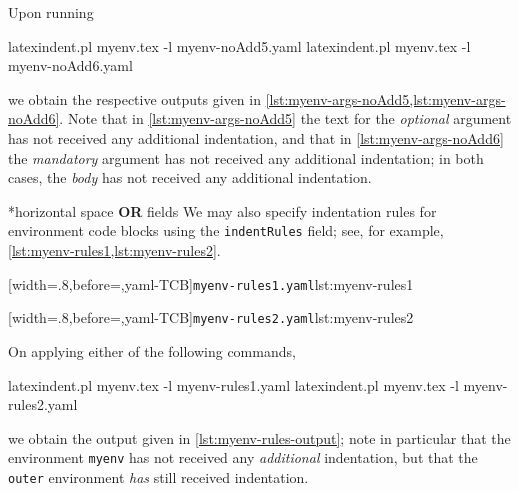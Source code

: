 Upon running
\begin{commandshell}
latexindent.pl myenv.tex -l myenv-noAdd5.yaml  
latexindent.pl myenv.tex -l myenv-noAdd6.yaml  
\end{commandshell}
we obtain the respective outputs given in \cref{lst:myenv-args-noAdd5,lst:myenv-args-noAdd6}. Note that in \cref{lst:myenv-args-noAdd5} 
the text for the \emph{optional} argument has not received any additional indentation, and that in \cref{lst:myenv-args-noAdd6} the 
\emph{mandatory} argument has not received any additional indentation; in both cases, the \emph{body} has not received any additional indentation.

\begin{minipage}{.45\textwidth}
\end{minipage}
\hfill
\begin{minipage}{.45\textwidth}
\end{minipage}

*{horizontal space {\bfseries OR} fields} 
We may also specify indentation rules for environment code blocks using the \texttt{indentRules} field; see, for example,
\cref{lst:myenv-rules1,lst:myenv-rules2}.

\begin{minipage}{.45\textwidth}
[width=.8\linewidth,before=\centering,yaml-TCB]{\texttt{myenv-rules1.yaml}}{lst:myenv-rules1}
\end{minipage}
\hfill
\begin{minipage}{.45\textwidth}
[width=.8\linewidth,before=\centering,yaml-TCB]{\texttt{myenv-rules2.yaml}}{lst:myenv-rules2}
\end{minipage}

On applying either of the following commands,
\begin{commandshell}
latexindent.pl myenv.tex -l myenv-rules1.yaml  
latexindent.pl myenv.tex -l myenv-rules2.yaml  
\end{commandshell}
we obtain the output given in \cref{lst:myenv-rules-output}; note in particular that the environment \texttt{myenv} 
has not received any \emph{additional} indentation, but that the \texttt{outer} environment \emph{has} still 
received indentation.

